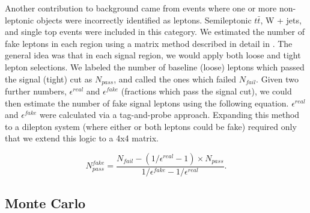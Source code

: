 \documentclass{article}
\begin{document}
Another contribution to background came from events where one or more non-leptonic objects were incorrectly identified as leptons. Semileptonic $t\bar{t}$, W + jets, and single top events were included in this category. We estimated the number of fake leptons in each region using a matrix method described in detail in \cite{fake_method}. The general idea was that in each signal region, we would apply both loose and tight lepton selections. We labeled the number of baseline (loose) leptons which passed the signal (tight) cut as $N_{pass}$, and called the ones which failed $N_{fail}$. Given two further numbers, $\epsilon^{real}$ and $\epsilon^{fake}$ (fractions which pass the signal cut), we could then estimate the number of fake signal leptons using the following equation. $\epsilon^{real}$ and $\epsilon^{fake}$ were calculated via a tag-and-probe approach. Expanding this method to a dilepton system (where either or both leptons could be fake) required only that we extend this logic to a 4x4 matrix.

\begin{equation}
N_{pass}^{fake} = \frac{N_{fail}-(1/\epsilon^{real}-1)\times N_{pass}}{1/\epsilon^{fake}-1/\epsilon^{real}}.
\end{equation}


\subsection*{Monte Carlo}
\end{document}
